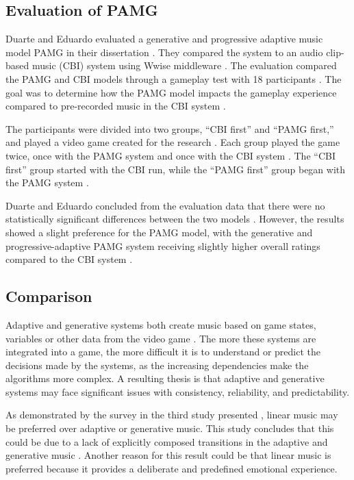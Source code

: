 \subsection{Evaluation of PAMG}
Duarte and Eduardo evaluated a generative and progressive adaptive music model PAMG in their dissertation \cite{lopez2023progressive}. They compared the system to an audio clip-based music (CBI) system using Wwise \cite{wwise} middleware \cite{lopez2023progressive}. The evaluation compared the PAMG and CBI models through a gameplay test with 18 participants \cite{lopez2023progressive}. The goal was to determine how the PAMG model impacts the gameplay experience compared to pre-recorded music in the CBI system \cite{lopez2023progressive}.

The participants were divided into two groups, “CBI first” and “PAMG first,” and played a video game created for the research \cite{lopez2023progressive}. Each group played the game twice, once with the PAMG system and once with the CBI system \cite{lopez2023progressive}. The “CBI first” group started with the CBI run, while the “PAMG first” group began with the PAMG system \cite{lopez2023progressive}.

Duarte and Eduardo concluded from the evaluation data that there were no statistically significant differences between the two models \cite{lopez2023progressive}. However, the results showed a slight preference for the PAMG model, with the generative and progressive-adaptive PAMG system receiving slightly higher overall ratings compared to the CBI system \cite{lopez2023progressive}.


\subsection{Comparison}
Adaptive and generative systems both create music based on game states, variables or other data from the video game \cite{plut2020generative} \cite{plut2022preglam}. The more these systems are integrated into a game, the more difficult it is to understand or predict the decisions made by the systems, as the increasing dependencies make the algorithms more complex. A resulting thesis is that adaptive and generative systems may face significant issues with consistency, reliability, and predictability.

As demonstrated by the survey in the third study presented \cite{plut2022preglam}, linear music may be preferred over adaptive or generative music. This study concludes that this could be due to a lack of explicitly composed transitions in the adaptive and generative music \cite{plut2022preglam}. Another reason for this result could be that linear music is preferred because it provides a deliberate and predefined emotional experience.

